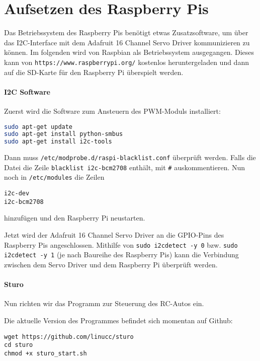 \documentclass[a4paper,10pt]{scrartcl}
\begin{document}
\section{Aufsetzen des Raspberry Pis}

  Das Betriebssystem des Raspberry Pis benötigt etwas Zusatzsoftware, um über das I2C-Interface mit
  dem Adafruit 16 Channel Servo Driver kommunizieren zu können.
  Im folgenden wird von Raspbian als Betriebssystem ausgegangen.
  Dieses kann von \lstinline{https://www.raspberrypi.org/} kostenlos heruntergeladen und dann auf
  die SD-Karte für den Raspberry Pi überspielt werden.

  \paragraph{I2C Software} Zuerst wird die Software zum Ansteuern des PWM-Moduls installiert:
    \begin{lstlisting}[language=sh]
sudo apt-get update
sudo apt-get install python-smbus
sudo apt-get install i2c-tools
    \end{lstlisting}

    Dann muss \lstinline{/etc/modprobe.d/raspi-blacklist.conf} überprüft werden.
    Falls die Datei die Zeile \lstinline{blacklist i2c-bcm2708} enthält, mit \lstinline{#}
    auskommentieren.
    Nun noch in \lstinline{/etc/modules} die Zeilen
    \begin{lstlisting}
i2c-dev
i2c-bcm2708
    \end{lstlisting}

    hinzufügen und den Raspberry Pi neustarten.

    Jetzt wird der Adafruit 16 Channel Servo Driver an die GPIO-Pins des Raspberry Pis
    angeschlossen.
    Mithilfe von \lstinline{sudo i2cdetect -y 0} bzw. \lstinline{sudo i2cdetect -y 1} (je nach
    Baureihe des Raspberry Pis) kann die Verbindung zwischen dem Servo Driver und dem Raspberry Pi
    überprüft werden.\cite{adafruitlearn}

  \paragraph{Sturo} Nun richten wir das Programm zur Steuerung des RC-Autos ein.

    Die aktuelle Version des Programmes befindet sich momentan auf Github:

    \begin{lstlisting}
wget https://github.com/linucc/sturo
cd sturo
chmod +x sturo_start.sh
    \end{lstlisting}
\end{document}
